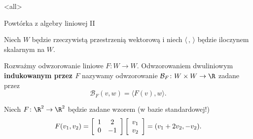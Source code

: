 \mode<all>{}
\begin{frame}{Powtórka z algebry liniowej II}

Niech $W$ będzie rzeczywistą przestrzenią wektorową i niech $\langle\,,\,\rangle$ będzie iloczynem skalarnym na $W$. 
\pause \begin{definicja}
Rozważmy odwzorowanie liniowe $F\colon W\to W$. Odwzorowaniem dwuliniowym \textbf{indukowanym przez $F$} nazywamy odwzorowanie $\mathcal{B}_F \colon W\times W\to \R$ zadane przez \[\mathcal{B}_F (v,w)=\langle F(v),w\rangle.\]
\end{definicja}
\pause \begin{przyklad}
Niech $F\colon \R^2 \to \R^2$ będzie zadane wzorem (w bazie standardowej!)
\[F( v_1 , v_2 ) = 
\left[\begin{array}{ c c }
1 & 2\\
0 & -1
\end{array}\right]
\left[\begin{array}{c}
v_1 \\
v_2
\end{array}
\right]=(v_1 + 2v_2 , -v_2).\]
\end{przyklad}
\end{frame}





